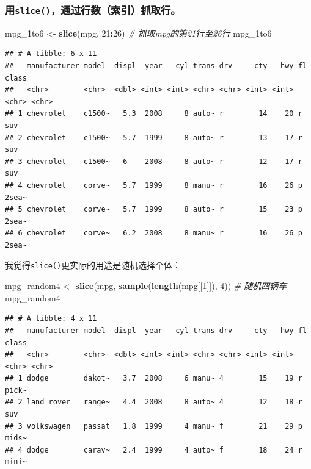 \documentclass[]{book}
\newenvironment{Shaded}{\begin{snugshade}}{\end{snugshade}}
\newcommand{\CommentTok}[1]{\textcolor[rgb]{0.56,0.35,0.01}{\textit{#1}}}
\newcommand{\DecValTok}[1]{\textcolor[rgb]{0.00,0.00,0.81}{#1}}
\newcommand{\KeywordTok}[1]{\textcolor[rgb]{0.13,0.29,0.53}{\textbf{#1}}}
\newcommand{\NormalTok}[1]{#1}
\newcommand{\OperatorTok}[1]{\textcolor[rgb]{0.81,0.36,0.00}{\textbf{#1}}}
\newcommand{\StringTok}[1]{\textcolor[rgb]{0.31,0.60,0.02}{#1}}
\begin{document}
\hypertarget{slice}{%
\subsubsection{\texorpdfstring{用\texttt{slice()}，通过行数（索引）抓取行。}{用slice()，通过行数（索引）抓取行。}}\label{slice}}

\begin{Shaded}
\begin{Highlighting}[]
\NormalTok{mpg_1to6 <-}\StringTok{ }\KeywordTok{slice}\NormalTok{(mpg, }\DecValTok{21}\OperatorTok{:}\DecValTok{26}\NormalTok{) }\CommentTok{# 抓取mpg的第21行至26行}
\NormalTok{mpg_1to6}
\end{Highlighting}
\end{Shaded}

\begin{verbatim}
## # A tibble: 6 x 11
##   manufacturer model  displ  year   cyl trans drv     cty   hwy fl    class
##   <chr>        <chr>  <dbl> <int> <int> <chr> <chr> <int> <int> <chr> <chr>
## 1 chevrolet    c1500~   5.3  2008     8 auto~ r        14    20 r     suv  
## 2 chevrolet    c1500~   5.7  1999     8 auto~ r        13    17 r     suv  
## 3 chevrolet    c1500~   6    2008     8 auto~ r        12    17 r     suv  
## 4 chevrolet    corve~   5.7  1999     8 manu~ r        16    26 p     2sea~
## 5 chevrolet    corve~   5.7  1999     8 auto~ r        15    23 p     2sea~
## 6 chevrolet    corve~   6.2  2008     8 manu~ r        16    26 p     2sea~
\end{verbatim}

我觉得\texttt{slice()}更实际的用途是随机选择个体：

\begin{Shaded}
\begin{Highlighting}[]
\NormalTok{mpg_random4 <-}\StringTok{ }\KeywordTok{slice}\NormalTok{(mpg, }\KeywordTok{sample}\NormalTok{(}\KeywordTok{length}\NormalTok{(mpg[[}\DecValTok{1}\NormalTok{]]), }\DecValTok{4}\NormalTok{)) }\CommentTok{# 随机四辆车}
\NormalTok{mpg_random4}
\end{Highlighting}
\end{Shaded}

\begin{verbatim}
## # A tibble: 4 x 11
##   manufacturer model  displ  year   cyl trans drv     cty   hwy fl    class
##   <chr>        <chr>  <dbl> <int> <int> <chr> <chr> <int> <int> <chr> <chr>
## 1 dodge        dakot~   3.7  2008     6 manu~ 4        15    19 r     pick~
## 2 land rover   range~   4.4  2008     8 auto~ 4        12    18 r     suv  
## 3 volkswagen   passat   1.8  1999     4 manu~ f        21    29 p     mids~
## 4 dodge        carav~   2.4  1999     4 auto~ f        18    24 r     mini~
\end{verbatim}
\end{document}
